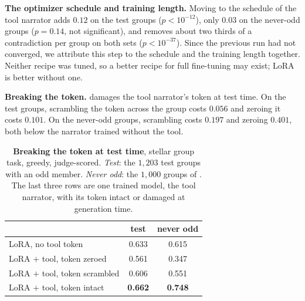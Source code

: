 \textbf{The optimizer schedule and training length.} Moving to the schedule of the tool
narrator adds $0.12$ on the test groups ($p<10^{-12}$), only $0.03$ on the never-odd groups
($p=0.14$, not significant), and removes about two thirds of a contradiction per group on
both sets ($p<10^{-37}$). Since the previous run had not converged, we attribute this step to
the schedule and the training length together. Neither recipe was tuned, so a better recipe
for full fine-tuning may exist; LoRA is better without one.


\textbf{Breaking the token.}  damages the tool narrator's token at test time.
On the test groups, scrambling the token across the group costs $0.056$ and zeroing it costs
$0.101$. On the never-odd groups, scrambling costs $0.197$ and zeroing $0.401$, both below the
narrator trained without the tool.

\begin{table}[h]\centering\small
\caption{\textbf{Breaking the token at test time}, stellar group task, greedy, judge-scored.
\emph{Test}: the $1{,}203$ test groups with an odd member. \emph{Never odd}: the $1{,}000$
groups of . The last three rows are one trained model, the tool narrator,
with its token intact or damaged at generation time.}
\label{tab:ablate}
\begin{tabular}{lcc}
\toprule
 & test & never odd \\
\midrule
LoRA, no tool token & 0.633 & 0.615 \\
\midrule
LoRA $+$ tool, token zeroed      & 0.561 & 0.347 \\
LoRA $+$ tool, token scrambled   & 0.606 & 0.551 \\
LoRA $+$ tool, token intact      & \textbf{0.662} & \textbf{0.748} \\
\bottomrule
\end{tabular}
\end{table}

